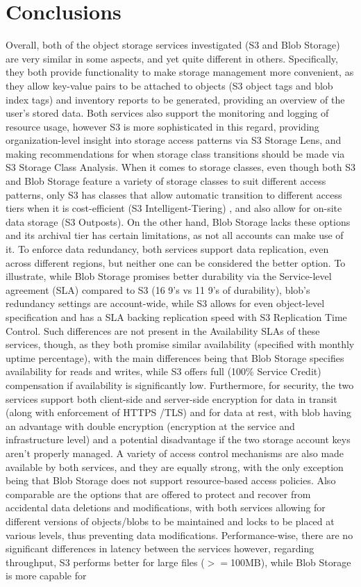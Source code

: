 \section{Conclusions}
Overall, both of the object storage services investigated (S3 and Blob Storage) are very similar in some aspects, and yet quite different in others. Specifically, they both provide functionality to make storage management more convenient, as they allow key-value pairs to be attached to objects (S3 object tags and blob index tags) and inventory reports to be generated, providing an overview of the user's stored data. Both services also support the monitoring and logging of resource usage, however S3 is more sophisticated in this regard, providing organization-level insight into storage access patterns via S3 Storage Lens, and making recommendations for when storage class transitions should be made via S3 Storage Class Analysis. When it comes to storage classes, even though both S3 and Blob Storage feature a variety of storage classes to suit different access patterns, only S3 has classes that allow automatic transition to different access tiers when it is cost-efficient (S3 Intelligent-Tiering) , and also allow for on-site data storage (S3 Outposts). On the other hand, Blob Storage lacks these options and its archival tier has certain limitations, as not all accounts can make use of it. To enforce data redundancy,  both services support data replication, even across different regions, but neither one can be considered the better option. To illustrate, while Blob Storage promises better durability via the Service-level agreement (SLA) compared to S3 (16 9's vs 11 9's of durability), blob's redundancy settings are account-wide, while S3 allows for even object-level specification and has a SLA backing replication speed with S3 Replication Time Control. Such differences are not present in the Availability SLAs of these services, though, as they both promise similar availability (specified with monthly uptime percentage), with the main differences being that Blob Storage specifies availability for reads and writes, while S3 offers full (100\% Service Credit) compensation if availability is significantly low. Furthermore, for security, the two services support both client-side and server-side encryption for data in transit (along with enforcement of HTTPS /TLS) and for data at rest, with blob having an advantage with double encryption (encryption at the service and infrastructure level) and a potential disadvantage if the two storage account keys aren't properly managed. A variety of access control mechanisms are also made available by both services, and they are equally strong, with the only exception being that Blob Storage does not support resource-based access policies. Also comparable are the options that are offered to protect and recover from accidental data deletions and modifications, with both services allowing for different versions of objects/blobs to be maintained and locks to be placed at various levels, thus preventing data modifications. Performance-wise, there are no significant differences in latency between the services however, regarding throughput, S3 performs better for large files ($>=$100MB), while Blob Storage is more capable for 